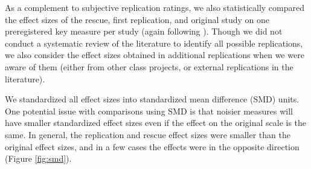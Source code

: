 \documentclass[
  english,
  a4paper,
]{article}
\begin{document}
As a complement to subjective replication ratings, we also statistically compared the effect sizes of the rescue, first replication, and original study on one preregistered key measure per study (again following ).
Though we did not conduct a systematic review of the literature to identify all possible replications, we also consider the effect sizes obtained in additional replications when we were aware of them (either from other class projects, or external replications in the literature).

We standardized all effect sizes into standardized mean difference (SMD) units.
One potential issue with comparisons using SMD is that noisier measures will have smaller standardized effect sizes even if the effect on the original scale is the same.
In general, the replication and rescue effect sizes were smaller than the original effect sizes, and in a few cases the effects were in the opposite direction (Figure \ref{fig:smd}).
\end{document}
